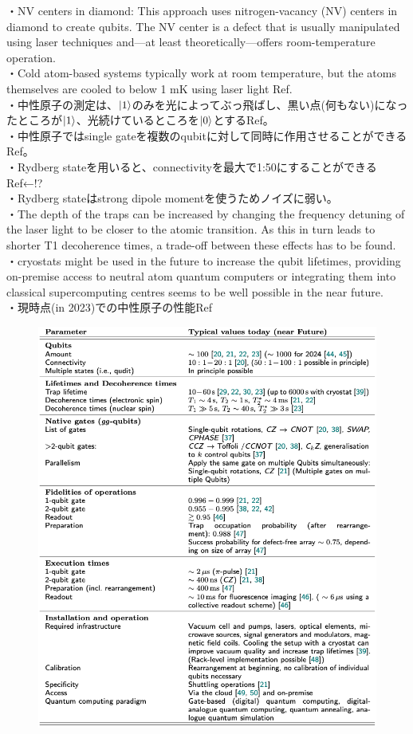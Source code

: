 \documentclass[a4paper,10.5pt]{ltjsarticle}
\begin{document}
・NV centers in diamond: This approach uses nitrogen-vacancy (NV) centers in diamond to create qubits. The NV center is a defect that is usually manipulated using laser techniques and—at least theoretically—offers room-temperature operation.\\
・Cold atom-based systems typically work at room temperature, but the atoms themselves are cooled to below 1 mK using laser light Ref\cite{1}.\\
・中性原子の測定は、$\ket{1}$のみを光によってぶっ飛ばし、黒い点(何もない)になったところが$\ket{1}$、光続けているところを$\ket{0}$とするRef\cite{1}。\\
・中性原子ではsingle gateを複数のqubitに対して同時に作用させることができるRef\cite{1}。\\
・Rydberg stateを用いると、connectivityを最大で1:50にすることができるRef\cite{1}←!?\\
・Rydberg stateはstrong dipole momentを使うためノイズに弱い。\\
・The depth of the traps can be increased by changing the frequency detuning of the laser light to be closer to the atomic transition. As this in turn leads to shorter T1 decoherence times, a trade-off between these effects has to be found.\\
・cryostats might be used in the future to increase the qubit lifetimes, providing on-premise access to neutral atom quantum computers or integrating them into classical supercomputing centres seems to be well possible in the near future.\\
\clearpage
・現時点(in 2023)での中性原子の性能Ref\cite{1}
\begin{figure}[h]
  \centering
  \includegraphics[scale=0.5]{figure1.png}
\end{figure}
\end{document}
